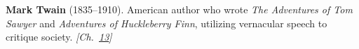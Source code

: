 \textbf{Mark Twain} (1835–1910). American author who wrote \emph{The Adventures of Tom Sawyer} and \emph{Adventures of Huckleberry Finn}, utilizing vernacular speech to critique society. \emph{[Ch.~\hyperref[ch:poissonsspot]{13}]}

